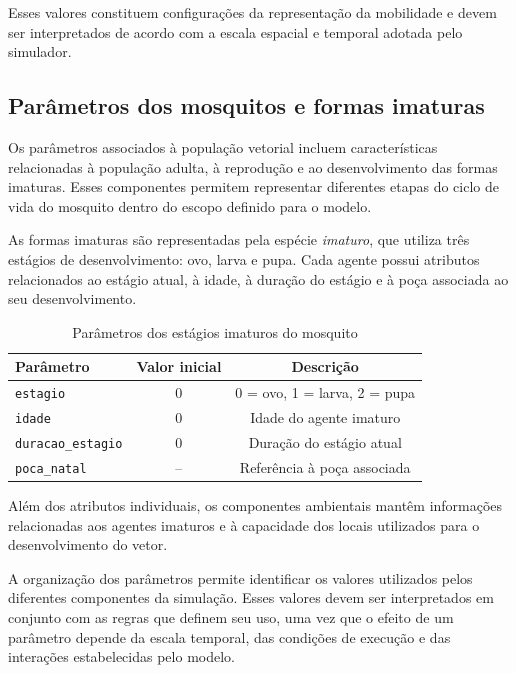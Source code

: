 Esses valores constituem configurações da representação da mobilidade e devem ser interpretados de acordo com a escala espacial e temporal adotada pelo simulador.

\subsection{Parâmetros dos mosquitos e formas imaturas}

Os parâmetros associados à população vetorial incluem características relacionadas à população adulta, à reprodução e ao desenvolvimento das formas imaturas. Esses componentes permitem representar diferentes etapas do ciclo de vida do mosquito dentro do escopo definido para o modelo.

As formas imaturas são representadas pela espécie \textit{imaturo}, que utiliza três estágios de desenvolvimento: ovo, larva e pupa. Cada agente possui atributos relacionados ao estágio atual, à idade, à duração do estágio e à poça associada ao seu desenvolvimento.

\begin{table}[htb]
    \centering
    \caption{Parâmetros dos estágios imaturos do mosquito}
    \label{tab:parametros-imaturos}
    \begin{tabular}{l c c}
        \hline
        \textbf{Parâmetro} & \textbf{Valor inicial} & \textbf{Descrição} \\
        \hline
        \texttt{estagio} & 0 & 0 = ovo, 1 = larva, 2 = pupa \\
        \texttt{idade} & 0 & Idade do agente imaturo \\
        \texttt{duracao\_estagio} & 0 & Duração do estágio atual \\
        \texttt{poca\_natal} & -- & Referência à poça associada \\
        \hline
    \end{tabular}
\end{table}

Além dos atributos individuais, os componentes ambientais mantêm informações relacionadas aos agentes imaturos e à capacidade dos locais utilizados para o desenvolvimento do vetor.

A organização dos parâmetros permite identificar os valores utilizados pelos diferentes componentes da simulação. Esses valores devem ser interpretados em conjunto com as regras que definem seu uso, uma vez que o efeito de um parâmetro depende da escala temporal, das condições de execução e das interações estabelecidas pelo modelo.

